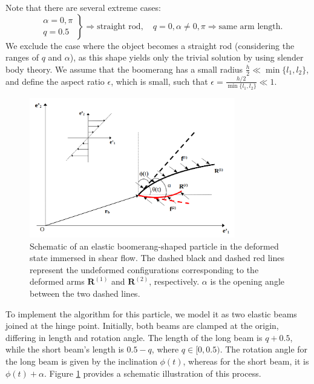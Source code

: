 \documentclass[a4paper,12pt]{report}
\begin{document}
Note that there are several extreme cases:
\begin{equation}
	\label{eqn:1}
	\left.
	\begin{aligned}
		&\alpha=0,\pi \\
		&	q=0.5
	\end{aligned}
	\right\}\Longrightarrow \text{straight rod},\quad 
	q=0, \alpha \neq 0, \pi \Longrightarrow \text{same arm length}.
\end{equation}
We exclude the case where the object becomes a straight rod (considering the ranges of $q$ and $\alpha$), as this shape yields only the trivial solution by using slender body theory. We assume that the boomerang has a small radius $\frac{h}{2}\ll \min\{l_1, l_2\}$, and define the aspect ratio $\epsilon$, which is small, such that $\epsilon=\frac{h/2}{\min\{l_1, l_2\}}\ll1$. 

\begin{figure}[!h]
	\begin{center}
		\includegraphics[width=0.8\textwidth]{plot/fluid.png}
		\caption{Schematic of an elastic boomerang-shaped particle in the deformed state immersed in shear flow. The dashed black and dashed red lines represent the undeformed configurations corresponding to the deformed arms $\mathbf{R}^{(1)}$ and $\mathbf{R}^{(2)}$, respectively. $\alpha$ is the opening angle between the two dashed lines.} 
		\label{fig:6}
	\end{center}
\end{figure}
To implement the algorithm for this particle, we model it as two elastic beams joined at the hinge point. Initially, both beams are clamped at the origin, differing in length and rotation angle. The length of the long beam is $q+0.5$, while the short beam's length is $0.5-q$, where $q \in [0,0.5)$. The rotation angle for the long beam is given by the inclination $\phi(t)$, whereas for the short beam, it is $\phi(t)+\alpha$. Figure \ref{fig:6} provides a schematic illustration of this process. 
\end{document}
